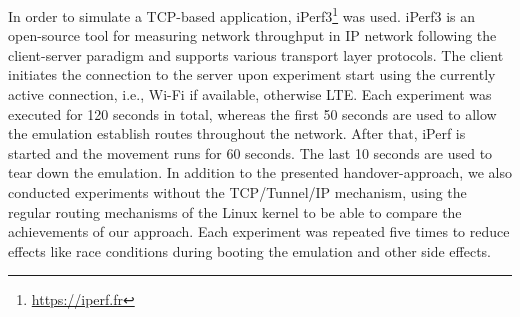 In order to simulate a TCP-based application, iPerf3\footnote{\url{https://iperf.fr}} was used.
iPerf3 is an open-source tool for measuring network throughput in IP network following the client-server paradigm and supports various transport layer protocols.
The client initiates the connection to the server upon experiment start using the currently active connection, i.e., Wi-Fi if available, otherwise LTE.
Each experiment was executed for 120 seconds in total,
whereas the first 50 seconds are used to allow the emulation establish routes throughout the network.%
After that, iPerf is started and the movement runs for 60 seconds.
The last 10 seconds are used to tear down the emulation.
In addition to the presented handover-approach, we also conducted experiments without the TCP/Tunnel/IP mechanism, using the regular routing mechanisms of the Linux kernel to be able to compare the achievements of our approach.
Each experiment was repeated five times to reduce effects like race conditions during booting the emulation and other side effects.


